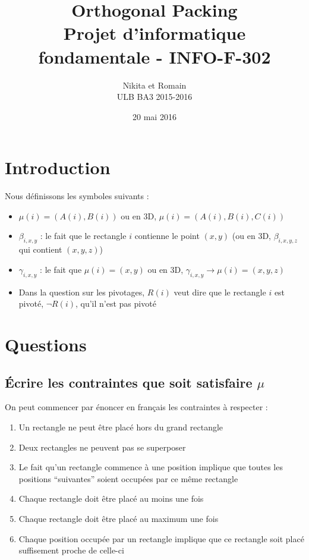 \documentclass[a4paper]{article}
\title{
    Orthogonal Packing\\
    \small Projet d'informatique fondamentale - INFO-F-302
}
\author{
    Nikita \bsc{Marchant} et Romain \bsc{Fontaine}\\
    ULB BA3 2015-2016
}
\date{20 mai 2016}
\begin{document}
\maketitle
\tableofcontents

\section{Introduction}

Nous définissons les symboles suivants :
\begin{itemize}
  \item $\mu(i) = (A(i), B(i))$ ou en 3D, $\mu(i) = (A(i), B(i), C(i))$
  \item $\beta_{i, x, y}$ : le fait que le rectangle $i$ contienne le point $(x, y)$ (ou en 3D, $\beta_{i, x, y, z}$ qui contient $(x, y, z)$)
  \item $\gamma_{i, x, y}$ : le fait que $\mu(i) = (x, y)$ ou en 3D, $\gamma_{i, x, y} \rightarrow \mu(i) = (x, y, z)$
  \item Dans la question sur les pivotages, $R(i)$ veut dire que le rectangle $i$ est pivoté, $\lnot R(i)$, qu'il n'est pas pivoté
\end{itemize}

\section{Questions}
\subsection{Écrire les contraintes que soit satisfaire $\mu$}

On peut commencer par énoncer en français les contraintes à respecter :
\begin{enumerate}
  \item Un rectangle ne peut être placé hors du grand rectangle
  \item Deux rectangles ne peuvent pas se superposer
  \item Le fait qu'un rectangle commence à une position implique que toutes les positions ``suivantes'' soient occupées par ce même rectangle
  \item Chaque rectangle doit être placé au moins une fois
  \item Chaque rectangle doit être placé au maximum une fois
  \item Chaque position occupée par un rectangle implique que ce rectangle soit placé suffisement proche de celle-ci
\end{enumerate}
\vspace{1em}
\end{document}
